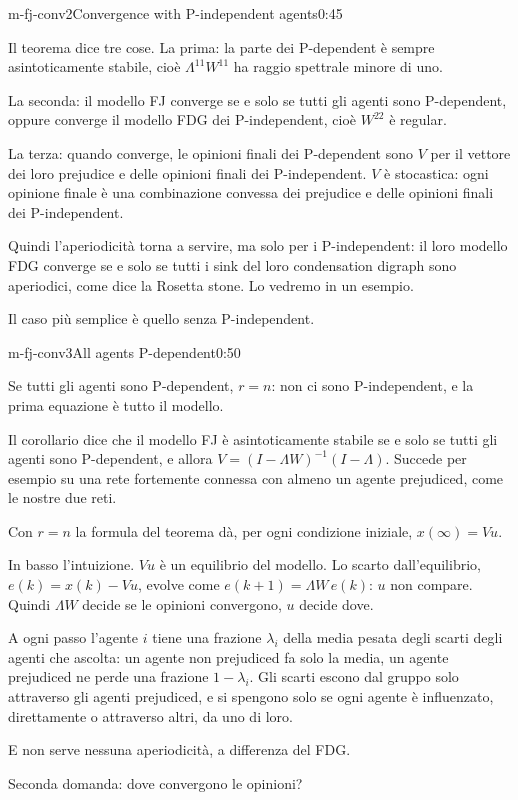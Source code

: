 \begin{slide}{m-fj-conv2}{Convergence with P-independent agents}{0:45}
  \begin{discorso}
    \item Il teorema dice tre cose. La prima: la parte dei P-dependent è sempre asintoticamente stabile, cioè $\Lambda^{11}W^{11}$ ha raggio spettrale minore di uno.
    \item La seconda: il modello FJ converge se e solo se tutti gli agenti sono P-dependent, oppure converge il modello FDG dei P-independent, cioè $W^{22}$ è regular.
    \item La terza: quando converge, le opinioni finali dei P-dependent sono $V$ per il vettore dei loro prejudice e delle opinioni finali dei P-independent. $V$ è stocastica: ogni opinione finale è una combinazione convessa dei prejudice e delle opinioni finali dei P-independent.
    \item Quindi l'aperiodicità torna a servire, ma solo per i P-independent: il loro modello FDG converge se e solo se tutti i sink del loro condensation digraph sono aperiodici, come dice la Rosetta stone. Lo vedremo in un esempio.
    \item Il caso più semplice è quello senza P-independent.
  \end{discorso}
\end{slide}

\begin{slide}{m-fj-conv3}{All agents P-dependent}{0:50}
  \begin{discorso}
    \item Se tutti gli agenti sono P-dependent, $r=n$: non ci sono P-independent, e la prima equazione è tutto il modello.
    \item Il corollario dice che il modello FJ è asintoticamente stabile se e solo se tutti gli agenti sono P-dependent, e allora $V=(I-\Lambda W)^{-1}(I-\Lambda)$. Succede per esempio su una rete fortemente connessa con almeno un agente prejudiced, come le nostre due reti.
    \item Con $r=n$ la formula del teorema dà, per ogni condizione iniziale, $x(\infty)=Vu$.
    \item In basso l'intuizione. $Vu$ è un equilibrio del modello. Lo scarto dall'equilibrio, $e(k)=x(k)-Vu$, evolve come $e(k+1)=\Lambda W\,e(k)$: $u$ non compare. Quindi $\Lambda W$ decide se le opinioni convergono, $u$ decide dove.
    \item A ogni passo l'agente $i$ tiene una frazione $\lambda_i$ della media pesata degli scarti degli agenti che ascolta: un agente non prejudiced fa solo la media, un agente prejudiced ne perde una frazione $1-\lambda_i$. Gli scarti escono dal gruppo solo attraverso gli agenti prejudiced, e si spengono solo se ogni agente è influenzato, direttamente o attraverso altri, da uno di loro.
    \item E non serve nessuna aperiodicità, a differenza del FDG.
    \item Seconda domanda: dove convergono le opinioni?
  \end{discorso}
\end{slide}

